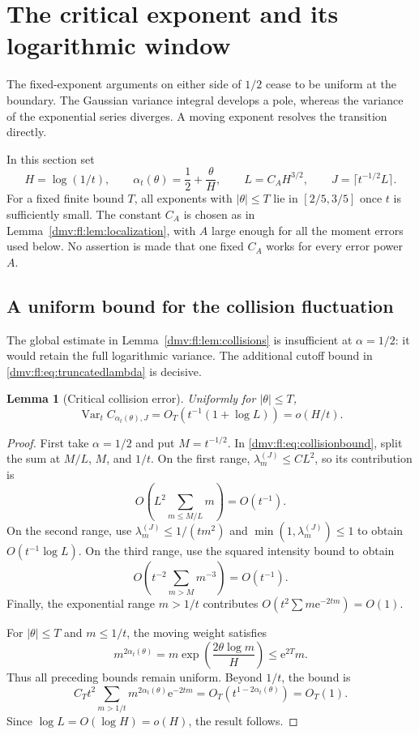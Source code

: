 \documentclass[11pt,letterpaper]{article}
\numberwithin{equation}{section}
\newtheorem{lemma}[theorem]{Lemma}
\theoremstyle{definition}\newtheorem{definition}[theorem]{Definition}
\theoremstyle{remark}\newtheorem{remark}[theorem]{Remark}
\newcommand{\ee}{\mathrm e}
\DeclareMathOperator{\Var}{Var}
\begin{document}
\section{The critical exponent and its logarithmic window}\label{dmv:fl:sec:critical}

The fixed-exponent arguments on either side of $1/2$ cease to be uniform
at the boundary. The Gaussian variance integral develops a pole, whereas
the variance of the exponential series diverges. A moving exponent
resolves the transition directly.

In this section set
\[
 H=\log(1/t),\qquad \alpha_t(\theta)=\frac12+\frac\theta H,
 \qquad L=C_AH^{3/2},\qquad J=\lceil t^{-1/2}L\rceil.
\]
For a fixed finite bound $T$, all exponents with $|\theta|\le T$ lie in
$[2/5,3/5]$ once $t$ is sufficiently small. The constant $C_A$ is chosen
as in Lemma~\ref{dmv:fl:lem:localization}, with $A$ large enough for all the
moment errors used below. No assertion is made that one fixed $C_A$
works for every error power $A$.

\subsection{A uniform bound for the collision fluctuation}
The global estimate in Lemma~\ref{dmv:fl:lem:collisions} is insufficient at
$\alpha=1/2$: it would retain the full logarithmic variance. The
additional cutoff bound in \eqref{dmv:fl:eq:truncatedlambda} is decisive.

\begin{lemma}[Critical collision error]\label{dmv:fl:lem:criticalcollision}
Uniformly for $|\theta|\le T$,
\begin{equation}\label{dmv:fl:eq:criticalcollision}
 \Var_t C_{\alpha_t(\theta),J}
 =O_T\!\left(t^{-1}(1+\log L)\right)=o(H/t).
\end{equation}
\end{lemma}
\begin{proof}
First take $\alpha=1/2$ and put $M=t^{-1/2}$. In
\eqref{dmv:fl:eq:collisionbound}, split the sum at $M/L$, $M$, and $1/t$.
On the first range, $\lambda_m^{(J)}\le CL^2$, so its contribution is
\[
 O\!\left(L^2\sum_{m\le M/L}m\right)=O(t^{-1}).
\]
On the second range, use $\lambda_m^{(J)}\le1/(tm^2)$ and
$\min(1,\lambda_m^{(J)})\le1$ to obtain $O(t^{-1}\log L)$.
On the third range, use the squared intensity bound to obtain
\[
 O\!\left(t^{-2}\sum_{m>M}m^{-3}\right)=O(t^{-1}).
\]
Finally, the exponential range $m>1/t$ contributes
$O(t^2\sum m\ee^{-2tm})=O(1)$.

For $|\theta|\le T$ and $m\le1/t$, the moving weight satisfies
\[
 m^{2\alpha_t(\theta)}
 =m\exp\left(\frac{2\theta\log m}{H}\right)\le\ee^{2T}m.
\]
Thus all preceding bounds remain uniform. Beyond $1/t$, the bound is
\[
 C_Tt^2\sum_{m>1/t}m^{2\alpha_t(\theta)}\ee^{-2tm}
 =O_T(t^{1-2\alpha_t(\theta)})=O_T(1).
\]
Since $\log L=O(\log H)=o(H)$, the result follows.
\end{proof}
\end{document}
